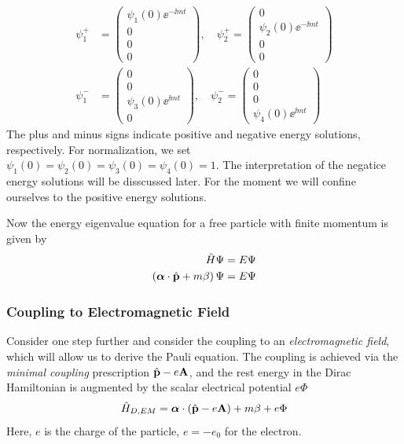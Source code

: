 \begin{align*}
    \psi_1^+ &= \begin{pmatrix}
        \psi_1(0) \ee^{-\ii m t} \\
        0 \\
        0 \\
        0
    \end{pmatrix}, \quad \psi_2^+ = \begin{pmatrix}
        0 \\
        \psi_2(0) \ee^{-\ii m t} \\
        0 \\
        0
    \end{pmatrix} \\
    \psi_1^- &= \begin{pmatrix}
        0 \\
        0 \\
        \psi_3(0) \ee^{\ii m t} \\
        0
    \end{pmatrix}, \quad \psi_2^- = \begin{pmatrix}
        0 \\
        0 \\
        0 \\
        \psi_4(0) \ee^{\ii m t}
    \end{pmatrix}
\end{align*}
The plus and minus signs indicate positive and negative energy solutions, respectively. For normalization, we set $\psi_1(0) = \psi_2(0) = \psi_3(0) = \psi_4(0) = 1$. 
The interpretation of the negatice energy solutions will be disscussed later. For the moment we will confine ourselves to the positive energy solutions. 

Now the energy eigenvalue equation for a free particle with finite momentum is given by 
\begin{align*}
    \hat{H} \Psi = E \Psi \\
    \left(\boldsymbol{\alpha} \cdot \hat{\mathbf{p}} + m \beta\right) \Psi = E \Psi
\end{align*}
\subsubsection{Coupling to Electromagnetic Field}
Consider one step further and consider the coupling to an \emph{electromagnetic field}, which will allow us to derive the Pauli equation. The coupling is achieved via the \emph{minimal coupling} prescription $\hat{\mathbf{p}} - e \mathbf{A}$, and the rest energy in the Dirac Hamiltonian is augmented by the scalar electrical potential $e \Phi$
\begin{align}
    \hat{H}_{D,EM} = \boldsymbol{\alpha} \cdot \left(\hat{\mathbf{p}} - e \mathbf{A}\right) + m \beta + e \Phi \label{eq:Dirac_Hamiltonian_EM}
\end{align}
Here, $e$ is the charge of the particle, $e = - e_0$ for the electron.

